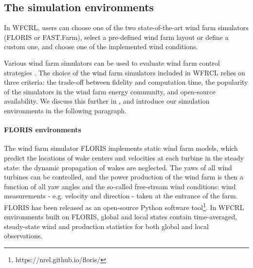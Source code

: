 \documentclass{article}
\newcommand{\md}[1]{{\color{red}#1}}
\begin{document}
\subsection{The simulation environments}\label{subsec:environments}
In WFCRL, users can choose one of the two state-of-the-art wind farm simulators (FLORIS or FAST.Farm), select a pre-defined wind farm layout or define a custom one, and choose one of the implemented wind conditions. 
%

Various wind farm simulators can be used to evaluate wind farm control strategies \cite{wake-models}. The choice of the wind farm simulators included in WFRCL relies on three criteria: the trade-off between fidelity and computation time, the popularity of the simulators in the wind farm energy community, and open-source availability. We discuss this further in , and introduce our simulation environments in the following paragraph.
\paragraph{FLORIS environments}
The wind farm simulator FLORIS implements static wind farm models, which
predict the locations of wake centers and velocities at each turbine 
in the steady state: the dynamic propagation of wakes are neglected. The yaws of all wind turbines can be controlled, and the power production of the wind farm is then a function of all yaw angles and the so-called free-stream wind conditions: wind measurements - e.g. velocity and direction - taken at the entrance of the farm. FLORIS has been released as an open-source Python software tool\footnote{https://nrel.github.io/floris/}. In WFCRL environments built on FLORIS, global and local states contain time-averaged, steady-state wind and production statistics for both global and local observations. 
\end{document}
